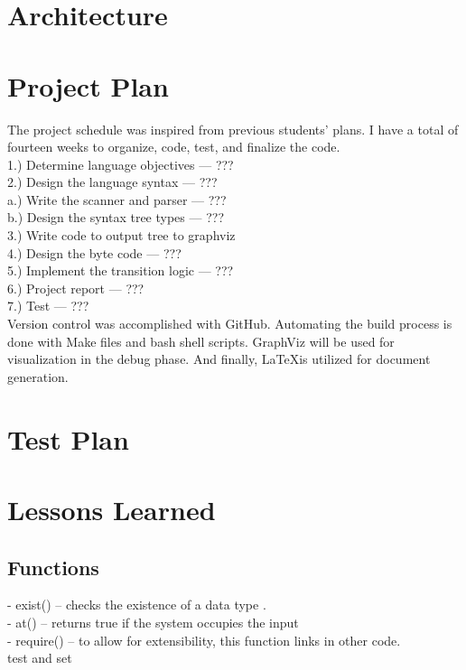 \documentclass[
a4paper, %
11pt, %
onecolumn, %
openany, %
]{memoir}
\begin{document}
\chapter{Architecture}

\chapter{Project Plan}
The project schedule was inspired from previous students' plans. I have a total of fourteen weeks to organize, code, test, and finalize the code.\\
1.) Determine language objectives --- ???\\
2.) Design the language syntax --- ???\\
a.) Write the scanner and parser --- ???\\
b.) Design the syntax tree types --- ???\\
3.) Write code to output tree to graphviz\\
4.) Design the byte code --- ???\\
5.) Implement the transition logic --- ???\\
6.) Project report --- ???\\
7.) Test --- ???\\

Version control was accomplished with GitHub. Automating the build process is done with Make files and bash shell scripts. GraphViz will be used for visualization in the debug phase. And finally, \LaTeX is utilized for document generation.

\chapter{Test Plan}

\chapter{Lessons Learned}

\section{Functions}
- exist() -- checks the existence of a data type \cite{appl_nasa}.\\
- at() -- returns true if the system occupies the input\\
- require() -- to allow for extensibility, this function links in other code.\\
test and set \\
\end{document}
